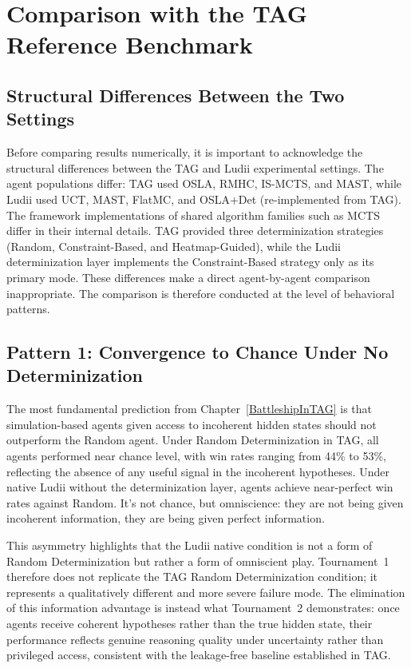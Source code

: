\section{Comparison with the TAG Reference Benchmark}
\label{sec:comparison_tag}

\subsection{Structural Differences Between the Two Settings}

Before comparing results numerically, it is important to acknowledge the structural differences between the TAG and Ludii experimental settings. The agent populations differ: TAG used OSLA, RMHC, IS-MCTS, and MAST, while Ludii used UCT, MAST, 
FlatMC, and OSLA+Det (re-implemented from TAG). The framework implementations of shared algorithm families such as MCTS differ in their internal details. TAG provided three determinization strategies (Random, Constraint-Based, and Heatmap-Guided), while the Ludii determinization layer implements the Constraint-Based strategy only as its primary mode. These differences make a direct agent-by-agent comparison inappropriate. The comparison is therefore conducted at the level of behavioral patterns.

\subsection{Pattern 1: Convergence to Chance Under No Determinization}
The most fundamental prediction from Chapter~\ref{BattleshipInTAG} is that 
simulation-based agents given access to incoherent hidden states should not 
outperform the Random agent. Under Random Determinization in TAG, all agents 
performed near chance level, with win rates ranging from 44\% to 53\%, 
reflecting the absence of any useful signal in the incoherent hypotheses. 
Under native Ludii without the determinization layer, agents achieve 
near-perfect win rates against Random. It's not chance, but omniscience: they 
are not being given incoherent information, they are being given perfect 
information.

This asymmetry highlights that the Ludii native condition is not a form of 
Random Determinization but rather a form of omniscient play. Tournament~1 
therefore does not replicate the TAG Random Determinization condition; it 
represents a qualitatively different and more severe failure mode. The 
elimination of this information advantage is instead what Tournament~2 
demonstrates: once agents receive coherent hypotheses rather than the true 
hidden state, their performance reflects genuine reasoning quality under 
uncertainty rather than privileged access, consistent with the leakage-free 
baseline established in TAG.

